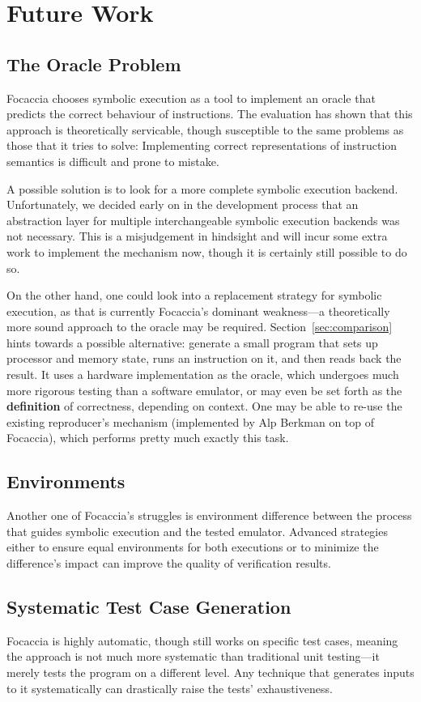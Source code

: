 \chapter{Future Work}\label{chapter:future_work}

\section{The Oracle Problem}

Focaccia chooses symbolic execution as a tool to implement an oracle that predicts the correct behaviour of
instructions. The evaluation has shown that this approach is theoretically servicable, though susceptible to the same
problems as those that it tries to solve: Implementing correct representations of instruction semantics is difficult and
prone to mistake.

A possible solution is to look for a more complete symbolic execution backend. Unfortunately, we decided early on in the
development process that an abstraction layer for multiple interchangeable symbolic execution backends was not
necessary. This is a misjudgement in hindsight and will incur some extra work to implement the mechanism now, though it
is certainly still possible to do so.

On the other hand, one could look into a replacement strategy for symbolic execution, as that is currently Focaccia's
dominant weakness---a theoretically more sound approach to the oracle may be required. Section~\ref{sec:comparison}
hints towards a possible alternative: generate a small program that sets up processor and memory state, runs an
instruction on it, and then reads back the result. It uses a hardware implementation as the oracle, which undergoes much
more rigorous testing than a software emulator, or may even be set forth as the \textbf{definition} of correctness,
depending on context. One may be able to re-use the existing reproducer's mechanism (implemented by Alp Berkman on top
of Focaccia), which performs pretty much exactly this task.

\section{Environments}

Another one of Focaccia's struggles is environment difference between the process that guides symbolic execution and the
tested emulator. Advanced strategies either to ensure equal environments for both executions or to minimize the
difference's impact can improve the quality of verification results.

\section{Systematic Test Case Generation}

Focaccia is highly automatic, though still works on specific test cases, meaning the approach is not much more
systematic than traditional unit testing---it merely tests the program on a different level. Any technique that
generates inputs to it systematically can drastically raise the tests' exhaustiveness.
